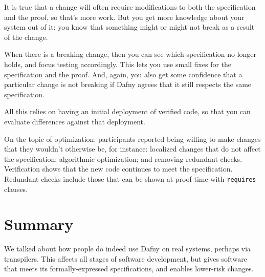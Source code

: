 \documentclass[11pt]{article}
\begin{document}
It is true that a change will often require modifications to both the
specification and the proof, so that's more work. But you get more
knowledge about your system out of it: you know that something might or might
not break as a result of the change.

When there is a breaking change, then you can see which specification
no longer holds, and focus testing accordingly. This lets you use
small fixes for the specification and the proof. And, again, you also get some confidence
that a particular change is not breaking if Dafny agrees that it still respects the same specification.

All this relies on having an initial deployment of verified code, so that you
can evaluate differences against that deployment.

On the topic of optimization: participants reported being willing to
make changes that they wouldn't otherwise be, for instance: localized
changes that do not affect the specification; algorithmic optimization;
and removing redundant checks. Verification shows that the new code continues
to meet the specification. Redundant checks include those that can be shown
at proof time with \texttt{requires} clauses.

\section*{Summary}
We talked about how people do indeed use Dafny on real systems, perhaps via
transpilers. This affects all stages of software development, but gives
software that meets its formally-expressed specifications, and enables
lower-risk changes.


%
%
\end{document}
